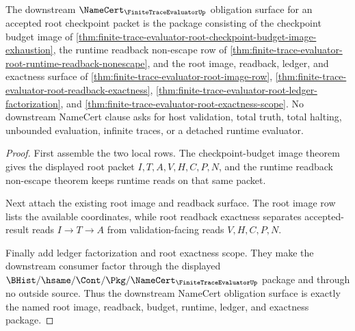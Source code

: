 \begin{theorem}
\label{thm:finite-trace-evaluator-root-namecert-downstream-package}
The downstream $\NameCert_{\FiniteTraceEvaluatorUp}$ obligation surface for an
accepted root checkpoint packet is the package consisting of the checkpoint
budget image of
\autoref{thm:finite-trace-evaluator-root-checkpoint-budget-image-exhaustion},
the runtime readback non-escape row of
\autoref{thm:finite-trace-evaluator-root-runtime-readback-nonescape}, and the
root image, readback, ledger, and exactness surface of
\autoref{thm:finite-trace-evaluator-root-image-row},
\autoref{thm:finite-trace-evaluator-root-readback-exactness},
\autoref{thm:finite-trace-evaluator-root-ledger-factorization}, and
\autoref{thm:finite-trace-evaluator-root-exactness-scope}. No downstream
NameCert clause asks for host validation, total truth, total halting,
unbounded evaluation, infinite traces, or a detached runtime evaluator.
\end{theorem}
\begin{proof}
First assemble the two local rows. The checkpoint-budget image theorem gives
the displayed root packet $I,T,A,V,H,C,P,N$, and the runtime readback
non-escape theorem keeps runtime reads on that same packet.

Next attach the existing root image and readback surface. The root image row
lists the available coordinates, while root readback exactness separates
accepted-result reads $I \to T \to A$ from validation-facing reads
$V,H,C,P,N$.

Finally add ledger factorization and root exactness scope. They make the
downstream consumer factor through the displayed
$\BHist/\hsame/\Cont/\Pkg/\NameCert_{\FiniteTraceEvaluatorUp}$ package and
through no outside source. Thus the downstream NameCert obligation surface is
exactly the named root image, readback, budget, runtime, ledger, and exactness
package.
\end{proof}
